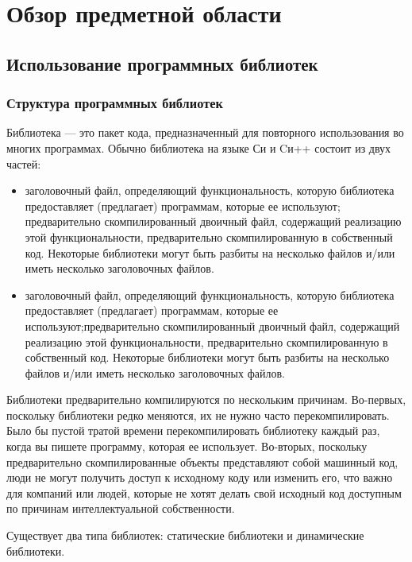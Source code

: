 \chapter{Обзор предметной области}\label{ch:ch1}
\section{Использование программных библиотек}\label{sec:ch1/sec1}
\subsection{Структура программных библиотек}\label{subsec:ch1/sec1/sub1}
Библиотека — это пакет кода, предназначенный для повторного использования во многих программах. Обычно библиотека на языке Си и Cи++ состоит из двух частей:
\begin{itemize}
    \item заголовочный файл, определяющий функциональность, которую библиотека предоставляет (предлагает) программам, которые ее используют;  предварительно скомпилированный двоичный файл, содержащий реализацию этой функциональности, предварительно скомпилированную в собственный код. Некоторые библиотеки могут быть разбиты на несколько файлов и/или иметь несколько заголовочных файлов.
    \item заголовочный файл, определяющий функциональность, которую библиотека предоставляет (предлагает) программам, которые ее используют;предварительно скомпилированный двоичный файл, содержащий реализацию этой функциональности, предварительно скомпилированную в собственный код. Некоторые библиотеки могут быть разбиты на несколько файлов и/или иметь несколько заголовочных файлов.
\end{itemize}

Библиотеки предварительно компилируются по нескольким причинам. Во-первых, поскольку библиотеки редко меняются, их не нужно часто перекомпилировать. Было бы пустой тратой времени перекомпилировать библиотеку каждый раз, когда вы пишете программу, которая ее использует. Во-вторых, поскольку предварительно скомпилированные объекты представляют собой машинный код, люди не могут получить доступ к исходному коду или изменить его, что важно для компаний или людей, которые не хотят делать свой исходный код доступным по причинам интеллектуальной собственности.

Существует два типа библиотек: статические библиотеки и динамические библиотеки.

